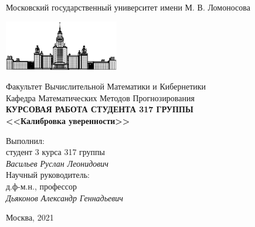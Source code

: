 \documentclass[12pt]{article}
\begin{document}
\begin{titlepage}
\begin{center}
    Московский государственный университет имени М. В. Ломоносова

    \bigskip
    \includegraphics[width=50mm]{msu.eps}

    \bigskip
    Факультет Вычислительной Математики и Кибернетики\\
    Кафедра Математических Методов Прогнозирования\\[10mm]

    {\large\textbf{
        КУРСОВАЯ РАБОТА СТУДЕНТА 317 ГРУППЫ\\[10mm]
        <<Калибровка уверенности>>}
    }\\[10mm]

    \begin{flushright}
        \parbox{0.5\textwidth}{
            Выполнил:\\
            студент 3 курса 317 группы\\
            \emph{Васильев Руслан Леонидович}\\[5mm]
            Научный руководитель:\\
            д.ф-м.н., профессор\\
            \emph{Дьяконов Александр Геннадьевич}
        }
    \end{flushright}


    \vspace{\fill}
    Москва, 2021
\end{center}
\end{titlepage}
\newpage
\tableofcontents
\newpage
\end{document}
